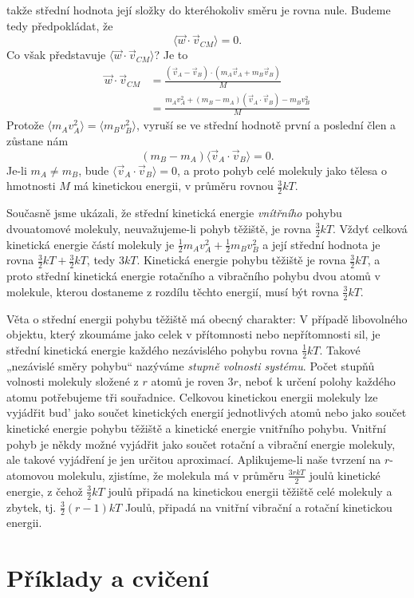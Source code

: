     takže střední hodnota její složky do kteréhokoliv směru je rovna nule. Budeme tedy předpokládat,
    že
    \begin{equation}\label{fyz:eq638}
      ⟨\vec{w}\cdot\vec{v}_{CM}⟩=0.
    \end{equation}
    Co však představuje \(⟨\vec{w}\cdot\vec{v}_{CM}⟩\)? Je to
    \begin{align}
      \vec{w}\cdot\vec{v}_{CM}
        &= \frac{(\vec{v}_A−\vec{v}_B)⋅(m_A\vec{v}_A+m_B\vec{v}_B)}{M}                   \nonumber\\
        &= \frac{m_Av^2_A+(m_B−m_A)(\vec{v}_A\cdot\vec{v}_B)−m_Bv^2_B}{M}          \label{fyz:eq637}
    \end{align}
    Protože \(⟨m_Av^2_A⟩=⟨m_Bv^2_B⟩\), vyruší se ve střední hodnotě první a poslední člen a zůstane
    nám
    \begin{equation}\label{fyz:eq639}
      (m_B−m_A)⟨\vec{v}_A\cdot\vec{v}_B⟩=0.
    \end{equation}
    Je-li \(m_A≠m_B\), bude \(⟨\vec{v}_A\cdot\vec{v}_B⟩=0\), a proto pohyb celé molekuly jako tělesa
    o hmotnosti \(M\) má kinetickou energii, v průměru rovnou \(\frac{3}{2}kT\).

    Současně jsme ukázali, že střední kinetická energie \emph{vnítřního} pohybu dvouatomové
    molekuly, neuvažujeme-li pohyb těžiště, je rovna \(\frac{3}{2}kT\). Vždyť celková kinetická
    energie částí molekuly je \(\frac{1}{2}m_Av^2_A+\frac{1}{2}m_Bv^2_B\) a její střední hodnota je
    rovna \(\frac{3}{2}kT + \frac{3}{2}kT\), tedy \(3kT\). Kinetická energie pohybu těžiště je rovna
    \(\frac{3}{2}kT\), a proto střední kinetická energie rotačního a vibračního pohybu dvou atomů v
    molekule, kterou dostaneme z rozdílu těchto energií, musí být rovna \(\frac{3}{2}kT\).

    Věta o střední energii pohybu těžiště má obecný charakter: V případě libovolného objektu, který
    zkoumáme jako celek v přítomnosti nebo nepřítomnosti sil, je střední kinetická energie každého
    nezávislého pohybu rovna \(\frac{1}{2}kT\). Takové „nezávislé směry pohybu“ nazýváme
    \emph{stupně volnosti systému}. Počet stupňů volnosti molekuly složené z \(r\) atomů je roven
    \(3r\), neboť k určení polohy každého atomu potřebujeme tři souřadnice. Celkovou kinetickou
    energii molekuly lze vyjádřit bud' jako součet kinetických energií jednotlivých atomů nebo jako
    součet kinetické energie pohybu těžiště a kinetické energie vnitřního pohybu. Vnitřní pohyb je
    někdy možné vyjádřit jako součet rotační a vibrační energie molekuly, ale takové vyjádření je
    jen určitou aproximací. Aplikujeme-li naše tvrzení na \(r\)-atomovou molekulu, zjistíme, že
    molekula má v průměru \(\frac{3rkT}{2}\) joulů kinetické energie, z čehož \(\frac{3}{2}kT\)
    joulů připadá na kinetickou energii těžiště celé molekuly a zbytek, tj. \(\frac{3}{2}(r-1)kT\)
    Joulů, připadá na vnitřní vibrační a rotační kinetickou energii.

  \section{Příklady a cvičení}\label{fyz:IchapIXLsecVI}

